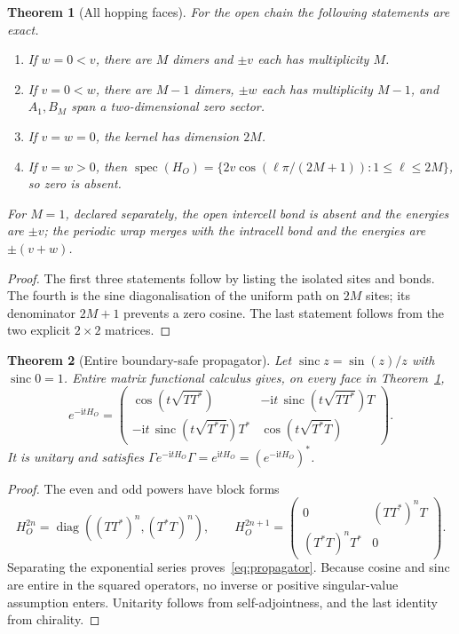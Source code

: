 \documentclass[10pt]{article}
\newtheorem{theorem}{Theorem}
\newcommand{\sinc}{\operatorname{sinc}}
\newcommand{\spec}{\operatorname{spec}}
\newcommand{\iu}{\mathrm{i}}
\begin{document}
\begin{theorem}[All hopping faces]\label{thm:faces}
For the open chain the following statements are exact.
\begin{enumerate}
\item If $w=0<v$, there are $M$ dimers and $\pm v$ each has multiplicity $M$.
\item If $v=0<w$, there are $M-1$ dimers, $\pm w$ each has multiplicity
$M-1$, and $A_1,B_M$ span a two-dimensional zero sector.
\item If $v=w=0$, the kernel has dimension $2M$.
\item If $v=w>0$, then
$\spec(H_O)=\{2v\cos(\ell\pi/(2M+1)):1\leq\ell\leq2M\}$, so zero is absent.
\end{enumerate}
For $M=1$, declared separately, the open intercell bond is absent and the
energies are $\pm v$; the periodic wrap merges with the intracell bond and
the energies are $\pm(v+w)$.
\end{theorem}
\begin{proof}
The first three statements follow by listing the isolated sites and bonds.
The fourth is the sine diagonalisation of the uniform path on $2M$ sites;
its denominator $2M+1$ prevents a zero cosine.  The last statement follows
from the two explicit $2\times2$ matrices.
\end{proof}

\begin{theorem}[Entire boundary-safe propagator]\label{thm:propagator}
Let $\sinc z=\sin(z)/z$ with $\sinc0=1$.  Entire matrix functional calculus
gives, on every face in Theorem~\ref{thm:faces},
\begin{equation}\label{eq:propagator}
 e^{-\iu tH_O}=\begin{pmatrix}
 \cos(t\sqrt{TT^*})&-\iu t\,\sinc(t\sqrt{TT^*})T\\
 -\iu t\,\sinc(t\sqrt{T^*T})T^*&\cos(t\sqrt{T^*T})
 \end{pmatrix}.
\end{equation}
It is unitary and satisfies
$\Gamma e^{-\iu tH_O}\Gamma=e^{\iu tH_O}=(e^{-\iu tH_O})^*$.
\end{theorem}
\begin{proof}
The even and odd powers have block forms
\[
 H_O^{2n}=\operatorname{diag}((TT^*)^n,(T^*T)^n),\qquad
 H_O^{2n+1}=\begin{pmatrix}0&(TT^*)^nT\\(T^*T)^nT^*&0\end{pmatrix}.
\]
Separating the exponential series proves~\eqref{eq:propagator}.  Because
cosine and sinc are entire in the squared operators, no inverse or positive
singular-value assumption enters.
Unitarity follows from self-adjointness, and the last identity from chirality.
\end{proof}
\fi
\end{document}
